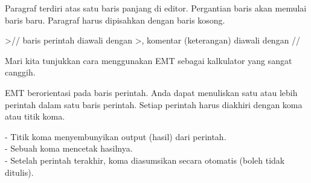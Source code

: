 \documentclass{article}
\begin{document}
\begin{eulernotebook}
\begin{eulercomment}
\begin{eulercomment}
\begin{eulercomment}
Paragraf terdiri atas satu baris panjang di editor. Pergantian baris
akan memulai baris baru. Paragraf harus dipisahkan dengan baris
kosong.
\end{eulercomment}
\begin{eulerprompt}
>// baris perintah diawali dengan >, komentar (keterangan) diawali dengan //
\end{eulerprompt}
\begin{eulercomment}
Mari kita tunjukkan cara menggunakan EMT sebagai kalkulator yang sangat
canggih.

EMT berorientasi pada baris perintah. Anda dapat menuliskan satu atau lebih
perintah dalam satu baris perintah. Setiap perintah harus diakhiri dengan koma
atau titik koma.

- Titik koma menyembunyikan output (hasil) dari perintah.\\
- Sebuah koma mencetak hasilnya.\\
- Setelah perintah terakhir, koma diasumsikan secara otomatis (boleh tidak
ditulis).


\end{eulercomment}
\end{eulercomment}
\end{eulercomment}
\end{eulernotebook}
\end{document}

